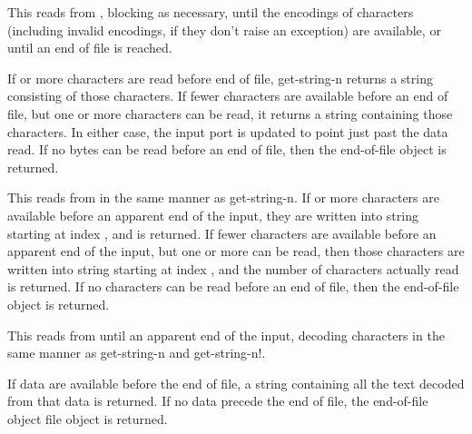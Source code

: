 \begin{entry}{%
}
   
This reads from , blocking as necessary, until the
encodings of  characters (including invalid encodings, if they
don't raise an exception) are available, or until an end of
file is reached.
   
If  or more characters are read before end of file, {\cf
  get-string-n} returns a string consisting of those 
characters. If fewer characters are available before an end of file,
but one or more characters can be read, it returns a string containing
those characters. In either case, the input port is updated to point
just past the data read. If no bytes can be read before an 
end of file, then the end-of-file object is returned.
\end{entry}

\begin{entry}{%
}


This reads from  in the same manner as {\cf
  get-string-n}.  If  or more characters are available
before an apparent end of the input, they are written into string
starting at index , and  is returned. If fewer
characters are available before an apparent end of the input, but one
or more can be read, then those characters are written into string
starting at index , and the number of characters actually read is
returned. If no characters can be read before an end of file,
then the end-of-file object is returned.
\end{entry}   

\begin{entry}{%
}
   
This reads from  until an apparent end of the input, decoding
characters in the same manner as {\cf get-string-n} and {\cf get-string-n!}.
   
If data are available before the end of file, a string
containing all the text decoded from that data is returned. If no data
precede the end of file, the end-of-file object file object is
returned.
\end{entry}

